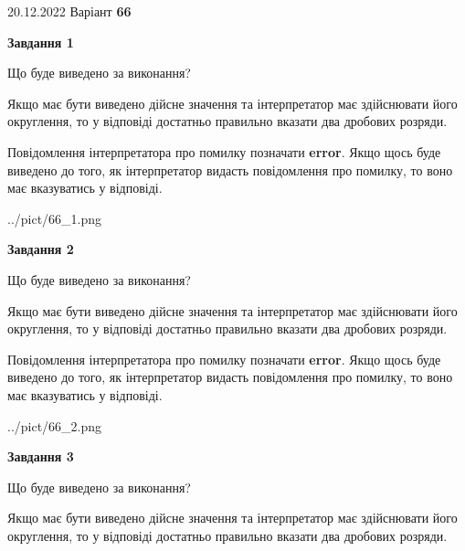 \documentclass[12pt, ukrainian]{article}
\begin{document}
{20.12.2022 Варіант \No \textbf { 66 }\par}
{
\begin {Large}

{\begin {center}\textbf{Завдання 1}\end {center}}\par
Що буде виведено за виконання? \par

Якщо має бути виведено дійсне значення та інтерпретатор має здійснювати його округлення, 
то у відповіді достатньо правильно вказати два дробових розряди.

Повідомлення інтерпретатора про помилку позначати \textbf{error}.
Якщо щось буде виведено до того, як інтерпретатор видасть повідомлення про помилку, 
то воно має вказуватись у відповіді. \par

\begin{center}
	{../pict/66_1.png}
\end{center}
\newpage

{\begin {center}\textbf{Завдання 2}\end {center}}\par
Що буде виведено за виконання? \par

Якщо має бути виведено дійсне значення та інтерпретатор має здійснювати його округлення, 
то у відповіді достатньо правильно вказати два дробових розряди.

Повідомлення інтерпретатора про помилку позначати \textbf{error}.
Якщо щось буде виведено до того, як інтерпретатор видасть повідомлення про помилку, 
то воно має вказуватись у відповіді. \par

\begin{center}
	{../pict/66_2.png}
\end{center}
\newpage

{\begin {center}\textbf{Завдання 3}\end {center}}\par
Що буде виведено за виконання? \par

Якщо має бути виведено дійсне значення та інтерпретатор має здійснювати його округлення, 
то у відповіді достатньо правильно вказати два дробових розряди.


\end{Large}}
\end{document}
